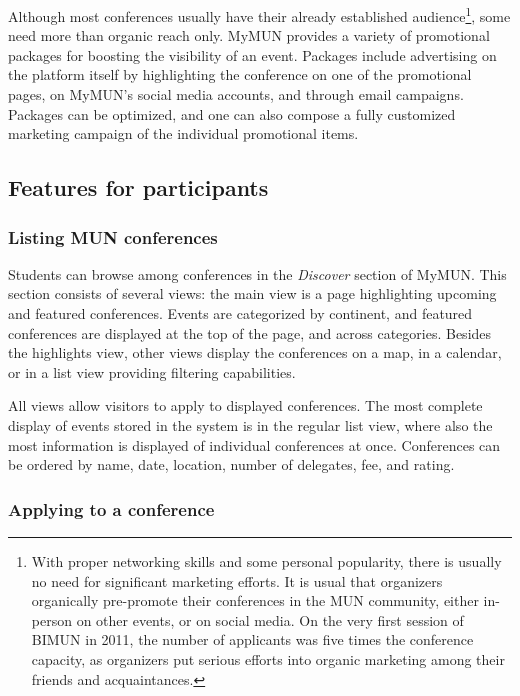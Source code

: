 Although most conferences usually have their already established audience\footnote{With proper networking skills and some personal popularity, there is usually no need for significant marketing efforts. It is usual that organizers organically pre-promote their conferences in the MUN community, either in-person on other events, or on social media. On the very first session of BIMUN in 2011, the number of applicants was five times the conference capacity, as organizers put serious efforts into organic marketing among their friends and acquaintances.}, some need more than organic reach only. MyMUN provides a variety of promotional packages for boosting the visibility of an event. Packages include advertising on the platform itself by highlighting the conference on one of the promotional pages, on MyMUN's social media accounts, and through email campaigns. Packages can be optimized, and one can also compose a fully customized marketing campaign of the individual promotional items.

\subsection{Features for participants}

\subsubsection{Listing MUN conferences}

Students can browse among conferences in the \emph{Discover} section of MyMUN. This section consists of several views: the main view is a page highlighting upcoming and featured conferences. Events are categorized by continent, and featured conferences are displayed at the top of the page, and across categories. Besides the highlights view, other views display the conferences on a map, in a calendar, or in a list view providing filtering capabilities.

All views allow visitors to apply to displayed conferences. The most complete display of events stored in the system is in the regular list view, where also the most information is displayed of individual conferences at once. Conferences can be ordered by name, date, location, number of delegates, fee, and rating.

\subsubsection{Applying to a conference}

